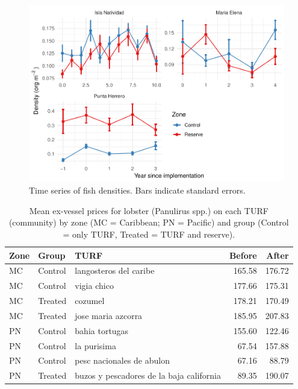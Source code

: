 \documentclass[utf8]{frontiers_suppmat} %
\begin{document}
\clearpage

\begin{figure}
\centering
\includegraphics{SupplementaryMaterial_files/figure-latex/unnamed-chunk-7-1.pdf}
\caption{\label{fig:unnamed-chunk-7}Time series of fish densities. Bars
indicate standard errors.}
\end{figure}

\clearpage

\begin{table}

\caption{\label{tab:unnamed-chunk-8}Mean ex-vessel prices for lobster (Panulirus spp.) on each TURF (community) by zone (MC = Caribbean; PN = Pacific) and group (Control = only TURF, Treated = TURF and reserve).}
\centering
\begin{tabular}[t]{lllrr}
\toprule
Zone & Group & TURF & Before & After\\
\midrule
MC & Control & langosteros del caribe & 165.58 & 176.72\\
MC & Control & vigia chico & 177.66 & 175.31\\
MC & Treated & cozumel & 178.21 & 170.49\\
MC & Treated & jose maria azcorra & 185.95 & 207.83\\
PN & Control & bahia tortugas & 155.60 & 122.46\\
\addlinespace
PN & Control & la purisima & 67.54 & 157.88\\
PN & Control & pesc nacionales de abulon & 67.16 & 88.79\\
PN & Treated & buzos y pescadores de la baja california & 89.35 & 190.07\\
\bottomrule
\end{tabular}
\end{table}
\end{document}
